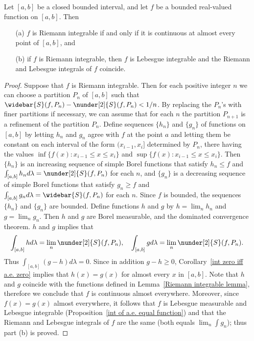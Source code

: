 \begin{theorem}\label{Riemann integrable char}
Let $[a,b]$ be a closed bounded interval, and let $f$ be a bounded real-valued function on $[a,b]$. Then
\begin{itemize}
\item[(a)] $f$ is Riemann integrable if and only if it is continuous at almost every point of $[a,b]$, and
\item[(b)] if $f$ is Riemann integrable, then $f$ is Lebesgue integrable and the Riemann and Lebesgue integrals of $f$ coincide.
\end{itemize}
\end{theorem}
\begin{proof}
Suppose that $f$ is Riemann integrable. Then for each positive integer $n$
we can choose a partition $P_n$ of $[a,b]$ such that $\widebar{S}(f,P_n)-\nunder[2]{S}(f,P_n)<1/n$. By replacing the $P_n$'s with finer partitions if necessary, we can assume that for each $n$ the partition $P_{n+1}$ is a refinement of the partition $P_n$. Define sequences $\{h_n\}$ and $\{g_n\}$ of functions on $[a,b]$ by letting $h_n$ and $g_n$ agree with $f$ at the point $a$ and letting them be constant on each interval of the form $(x_{i-1},x_i]$ determined by $P_n$, there having the values $\inf\{f(x):x_{i-1}\leq x\leq x_i\}$ and $\sup\{f(x):x_{i-1}\leq x\leq x_i\}$. Then $\{h_n\}$ is an increasing sequence of simple Borel functions that satisfy $h_n\leq f$ and $\int_{[a,b]}h_n d\lambda=\nunder[2]{S}(f,P_n)$ for each $n$, and $\{g_n\}$ is a decreasing sequence of simple Borel functions that satisfy $g_n\geq f$ and $\int_{[a,b]}g_n d\lambda=\widebar{S}(f,P_n)$ for each $n$. Since $f$ is bounded, the sequences $\{h_n\}$ and $\{g_n\}$ are bounded. Define functions $h$ and $g$ by $h=\lim_nh_n$ and $g=\lim_ng_n$. Then $h$ and $g$ are Borel measurable, and the dominated convergence theorem. $h$ and $g$ implies that 
\[\int_{[a,b]}hd\lambda=\lim_n\nunder[2]{S}(f,P_n),\quad\int_{[a,b]}gd\lambda=\lim_n\nunder[2]{S}(f,P_n).\]
Thus $\int_{[a,b]}(g-h)d\lambda=0$. Since in addition $g-h\geq 0$, Corollary~\ref{int zero iff a.e. zero} implies that $h(x)=g(x)$ for almost every $x$ in $[a,b]$. Note that $h$ and $g$ coincide with the functions defined in Lemma~\ref{Riemann integrable lemma}, therefore we conclude that $f$ is continuous almost everywhere. Moreover, since $f(x)=g(x)$ almost everywhere, it follows that $f$ is Lebesgue measurable and Lebesgue integrable (Proposition~\ref{int of a.e. equal function}) and that the Riemann and Lebesgue integrals of $f$ are the same (both equals $\lim_n\int g_n$); thus part (b) is proved.\par

\end{proof}
